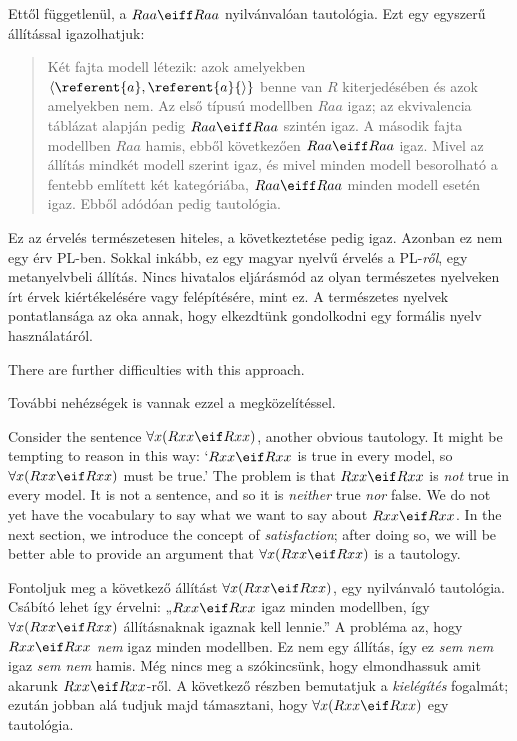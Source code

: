 Ettől függetlenül, a $Raa\eiff Raa$ nyilvánvalóan tautológia. Ezt egy egyszerű állítással igazolhatjuk:
\begin{quote}
\label{allmodels1}
Két fajta modell létezik: azok amelyekben ${\langle}\referent{a},\referent{a}{\rangle}$ benne van $R$ kiterjedésében és azok amelyekben nem. Az első típusú modellben $Raa$ igaz; az ekvivalencia táblázat alapján pedig $Raa\eiff Raa$ szintén igaz. A második fajta modellben $Raa$ hamis, ebből következően $Raa\eiff Raa$ igaz. Mivel az állítás mindkét modell szerint igaz, és mivel minden modell besorolható a fentebb említett két kategóriába, $Raa\eiff Raa$ minden modell esetén igaz. Ebből adódóan pedig tautológia.
\end{quote}
Ez az érvelés természetesen hiteles, a következtetése pedig igaz. Azonban ez nem egy érv PL-ben. Sokkal inkább, ez egy magyar nyelvű érvelés a PL-\emph{ről}, egy metanyelvbeli állítás. Nincs hivatalos eljárásmód az olyan természetes nyelveken írt érvek kiértékelésére vagy felépítésére, mint ez. A természetes nyelvek pontatlansága az oka annak, hogy elkezdtünk gondolkodni egy formális nyelv használatáról.


There are further difficulties with this approach.

További nehézségek is vannak ezzel a megközelítéssel. 

Consider the sentence $\forall x(Rxx\eif Rxx)$, another obvious tautology. It might be tempting to reason in this way: `$Rxx\eif Rxx$ is true in every model, so $\forall x(Rxx\eif Rxx)$ must be true.' The problem is that $Rxx\eif Rxx$ is \emph{not} true in every model. It is not a sentence, and so it is \emph{neither} true \emph{nor} false. We do not yet have the vocabulary to say what we want to say about $Rxx\eif Rxx$. In the next section, we introduce the concept of \emph{satisfaction}; after doing so, we will be better able to provide an argument that $\forall x(Rxx\eif Rxx)$ is a tautology.

Fontoljuk meg a következő állítást $\forall x(Rxx\eif Rxx)$, egy nyilvánvaló tautológia. Csábító lehet így érvelni: „$Rxx\eif Rxx$ igaz minden modellben, így $\forall x(Rxx\eif Rxx)$ állításnaknak igaznak kell lennie.” A probléma az, hogy  $Rxx\eif Rxx$ \emph{nem} igaz minden modellben. Ez nem egy állítás, így ez \emph{sem nem} igaz \emph{sem nem} hamis. Még nincs meg a szókincsünk, hogy elmondhassuk amit akarunk $Rxx\eif Rxx$-ről. A következő részben bemutatjuk a \emph{kielégítés} fogalmát; ezután jobban alá tudjuk majd támasztani, hogy $\forall x(Rxx\eif Rxx)$ egy tautológia.

